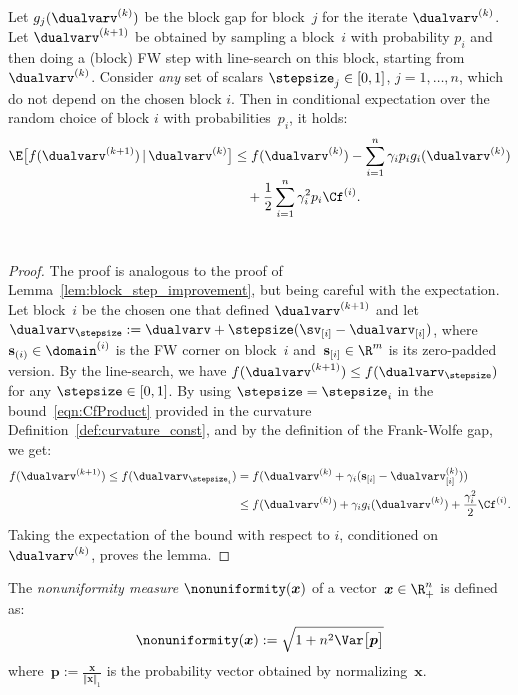 \documentclass{article}
\begin{document}
\begin{lemma} \label{lemma:convGapSampling:expectedDescent}
	Let $g_j(\dualvarv^{(k)})$ be the block gap for block~$j$ for the iterate $\dualvarv^{(k)}$. Let $\dualvarv^{(k+1)}$ be obtained by sampling a block~$i$ with probability $p_i$ and then doing a (block) FW step with line-search on this block, starting from $\dualvarv^{(k)}$. Consider \emph{any} set of scalars $\stepsize_j \in [0,1]$, $j = 1, \ldots, n$, which do not depend on the chosen block $i$.
    Then in conditional expectation over the random choice of block $i$ with probabilities~$p_i$, it holds:
    \begin{align}  
    \notag\E\big[ f(\dualvarv^{(k+1)})\,|\, \dualvarv^{(k)}\big]
    &\le f(\dualvarv^{(k)}) -  \sum_{i=1}^n{\gamma_i p_i g_i(\dualvarv^{(k)})} \\[-0.1cm]
    \label{mineq} &\quad + \frac{1}{2}\sum_{i=1}^n{\gamma_i^2 p_i \Cf^{(i)}}.
    \end{align}\\[-1.0cm]
\end{lemma}
\begin{proof}
    The proof is analogous to the proof of Lemma~\ref{lem:block_step_improvement}, but being careful with the expectation. Let block~$i$ be the chosen one that defined $\dualvarv^{(k+1)}$ and let $\dualvarv_\stepsize := \dualvarv+\stepsize(\sv_{[i]}-\dualvarv_{[i]})$, where $\mathbf{s}_{(i)}\in \domain^{(i)}$ is the FW corner on block~$i$ and~$\mathbf{s}_{[i]} \in \R^m$ is its zero-padded version. By the line-search, we have $f(\dualvarv^{(k+1)}) \leq f(\dualvarv_\stepsize)$ for any $\stepsize \in [0,1]$. By using $\stepsize = \stepsize_i$ in the bound~\eqref{eqn:CfProduct} provided in the curvature Definition~\ref{def:curvature_const}, and by the definition of the Frank-Wolfe gap, we get:
    \begin{align*}
    f(\dualvarv^{(k+1)}) \leq  f(\dualvarv_{\stepsize_i})
    &= 
    f(\dualvarv^{(k)} + \gamma_i (\mathbf{s}_{[i]} - \dualvarv^{(k)}_{[i]})) \\
    & \leq f(\dualvarv^{(k)}) + \gamma_i g_i(\dualvarv^{(k)}) + \frac{\gamma_i^2}{2}\Cf^{(i)}.
    \end{align*}
    Taking the expectation of the bound with respect to $i$, conditioned on $\dualvarv^{(k)}$, proves the lemma.
\end{proof}

\begin{definition}
    \label{def:nonUnifMeasure}
    The \emph{nonuniformity measure} $\nonuniformity(\bm{x})$ of a vector~$\bm{x}\in\R^n_+$ is defined as:
    \begin{equation*}
    \nonuniformity(\bm{x}) 
    :=  
    \sqrt{1+n^2\Var \big[\bm{p}\big]}
    \end{equation*}
    where~$\bm{p} := \frac{\bm{x}}{\Vert \bm{x} \Vert_1}$ is the probability vector obtained by normalizing~$\bm{x}$.
\end{definition}
\end{document}
